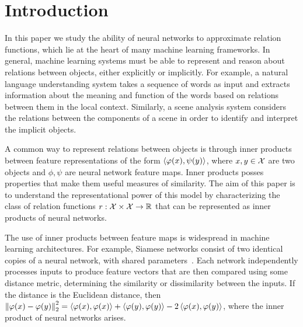 \section{Introduction}\label{sec:intro}


In this paper we study the ability of neural networks to approximate relation functions, which lie at the heart of many machine learning frameworks. In general, machine learning systems must be able to represent and reason about relations between objects, either explicitly or implicitly. For example, a natural language understanding system takes a sequence of words as input and extracts information about the meaning and function of the words based on relations between them in the local context. Similarly, a scene analysis system considers the relations between the components of a scene in order to identify and interpret the implicit objects.

A common way to represent relations between objects is through inner products between feature representations of the form $\left \langle \varphi(x), \psi(y) \right\rangle$, where $x, y \in {\mathcal{X}}$ are two objects and $\phi, \psi$ are neural network feature maps. Inner products posses properties that make them useful measures of similarity. The aim of this paper is to understand the representational power of this model by characterizing the class of relation functions $r: {\mathcal{X}} \times {\mathcal{X}} \to \mathbb{R}$ that can be represented as inner products of neural networks.

The use of inner products between feature maps is widespread in machine learning architectures. 
For example, Siamese networks consist of two identical copies of a neural network, with shared parameters~\parencite{rumelhartLearningRepresentationsBackpropagating1986,langTimedelayNeuralNetwork1988,bromleySignatureVerificationUsing1993,baldiNeuralNetworksFingerprint1993,chopraLearningSimilarityMetric2005,kochSiameseNeuralNetworks2015}. Each network independently processes inputs to produce feature vectors that are then compared using some distance metric, determining the similarity or dissimilarity between the inputs. If the distance is the Euclidean distance, then $\left\lVert\varphi(x) - \varphi(y)\right\rVert_{2}^2 = \left \langle \varphi(x), \varphi(x) \right\rangle + \left \langle \varphi(y), \varphi(y) \right\rangle - 2 \left \langle \varphi(x), \varphi(y) \right\rangle$, where the inner product of neural networks arises.

